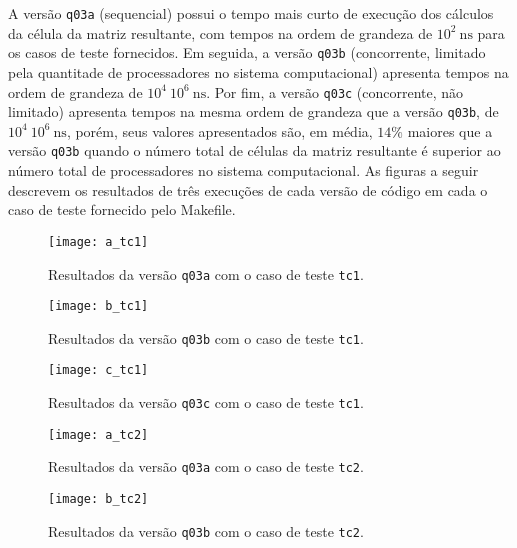 A versão \texttt{q03a} (sequencial) possui o tempo mais curto de execução dos cálculos da célula da matriz resultante, com tempos na ordem de grandeza de $10^2 \ \text{ns}$  para os casos de teste fornecidos. Em seguida, a versão \texttt{q03b} (concorrente, limitado pela quantitade de processadores no sistema computacional) apresenta tempos na ordem de grandeza de $10^4~10^6 \ \text{ns}$. Por fim, a versão \texttt{q03c} (concorrente, não limitado) apresenta tempos na mesma ordem de grandeza que a versão \texttt{q03b}, de $10^4~10^6 \ \text{ns}$, porém, seus valores apresentados são, em média, $14\%$ maiores que a versão \texttt{q03b} quando o número total de células da matriz resultante é superior ao número total de processadores no sistema computacional. As figuras a seguir descrevem os resultados de três execuções de cada versão de código em cada o caso de teste fornecido pelo Makefile.

\begin{figure}[H]
	\begin{center}
		\texttt{[image: a\_tc1]}
		\caption{Resultados da versão \texttt{q03a} com o caso de teste \texttt{tc1}.}
		\label{fig:a_tc1}
	\end{center}
\end{figure}

\begin{figure}[H]
	\begin{center}
		\texttt{[image: b\_tc1]}
		\caption{Resultados da versão \texttt{q03b} com o caso de teste \texttt{tc1}.}
		\label{fig:b_tc1}
	\end{center}
\end{figure}

\begin{figure}[H]
	\begin{center}
		\texttt{[image: c\_tc1]}
		\caption{Resultados da versão \texttt{q03c} com o caso de teste \texttt{tc1}.}
		\label{fig:c_tc1}
	\end{center}
\end{figure}

\begin{figure}[H]
	\begin{center}
		\texttt{[image: a\_tc2]}
		\caption{Resultados da versão \texttt{q03a} com o caso de teste \texttt{tc2}.}
		\label{fig:a_tc2}
	\end{center}
\end{figure}

\begin{figure}[H]
	\begin{center}
		\texttt{[image: b\_tc2]}
		\caption{Resultados da versão \texttt{q03b} com o caso de teste \texttt{tc2}.}
		\label{fig:b_tc2}
	\end{center}
\end{figure}

